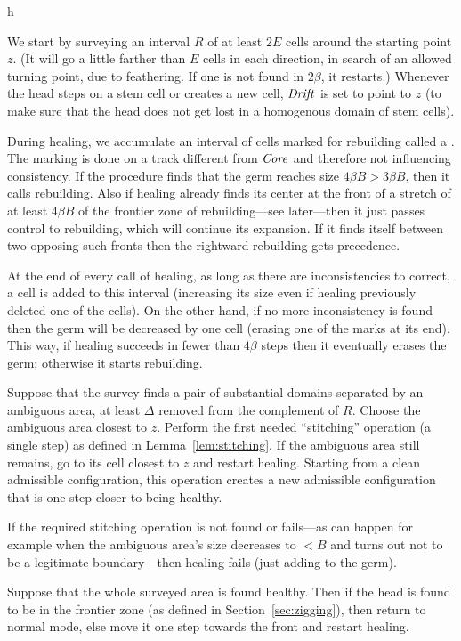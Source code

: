 \documentclass[11pt]{memoir}
\theoremstyle{definition} %
\newcommand{\fld}[1]{\ensuremath{\textit{#1\/}}}
\def\B{B}
\newcommand{\E}{E} %
\newcommand{\R}{R} %
\newcommand{\z}{z} %
\newcommand{\Core}{\fld{Core}}
\newcommand{\Drift}{\fld{Drift}}
\begin{document}
\begin{varenum}{h}
\item
We start by surveying an interval \( \R \) of at least \( 2\E \) cells 
around the starting point \( z \).
(It will go a little farther than \( \E \) cells in each direction,
in search of an allowed turning point, due to feathering.
If one is not found in \( 2\beta \), it restarts.)
Whenever the head steps on a stem cell or creates a new cell, 
\( \Drift \) is set to point to \( \z \) (to make sure that the head does not get
lost in a homogenous domain of stem cells).

\item\label{i:heal.germ}
During healing, we accumulate an interval of cells marked for rebuilding called a .
The marking is done on a track different from \( \Core \) and therefore not influencing consistency.
If the procedure finds that the germ reaches size  \( 4\beta\B > 3\beta\B \), then it calls rebuilding.
Also  if  healing already finds its center at the front of a stretch of 
at least \( 4\beta\B \) of the frontier zone of rebuilding---see later---then
it just passes control to rebuilding, which will continue its expansion.
If it finds itself between two opposing such fronts then the rightward rebuilding
gets precedence.

\item
At the end of every call of healing, as long as there are inconsistencies to correct, 
a cell is added to this interval (increasing its size even if healing
previously deleted one of the cells).
On the other hand, if no more inconsistency is found then the germ will be decreased by one cell
(erasing one of the marks at its end).
This way, if healing succeeds in fewer than  \( 4\beta \) steps then it eventually erases the germ;
otherwise it starts rebuilding.

\item 
Suppose that the survey finds a pair of substantial domains separated by an ambiguous area,
at least \( \Delta \) removed from the complement of \( R \). 
Choose the ambiguous area closest to \( z \).
Perform the first needed ``stitching'' operation (a single step) as defined in Lemma~\ref{lem:stitching}.
If the ambiguous area still remains, go to its cell closest to \( z \) and restart healing.
Starting from a clean admissible configuration, this operation creates a new admissible
configuration that is one step closer to being healthy.

If the required stitching operation is not found or fails---as
can happen for example when the ambiguous area's size decreases to \( <\B \) and turns out not to be
a legitimate boundary---then healing fails (just adding to the germ).

\item
Suppose that the whole surveyed area is found healthy.
Then if the head is found to be in the frontier zone (as defined in Section~\ref{sec:zigging}),
then return to normal mode, else move it one step towards the front and restart healing.
\end{varenum}
\end{document}
